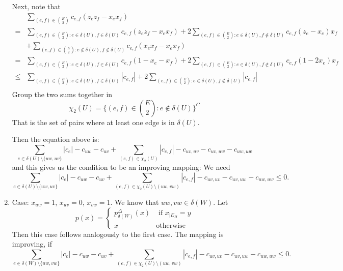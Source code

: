\begin{enumerate}
Next, note that 
\begin{align*}
    & \sum_{(e,f) \in \binom{E}{2}} c_{e,f} (z_e z_f-x_e x_f) \\
    =&  \sum_{(e,f) \in \binom{E}{2}: e \in \delta(U), f \in \delta(U)} c_{e,f} (z_e z_f-x_e x_f) + 2 \sum_{(e,f) \in \binom{E}{2}: e \in \delta(U), f \notin \delta(U)} c_{e,f} (z_e-x_e)x_f \\
    & +\sum_{(e,f) \in \binom{E}{2}: e \notin \delta(U), f \notin \delta(U)} c_{e,f} (x_e x_f - x_e x_f) \\
    =&  \sum_{(e,f) \in \binom{E}{2}: e \in \delta(U), f \in \delta(U)} c_{e,f} (1-x_e-x_f) + 2 \sum_{(e,f) \in \binom{E}{2}: e \in \delta(U), f \notin \delta(U)} c_{e,f} (1-2x_e)x_f \\ 
    \leq &  \sum_{(e,f) \in \binom{E}{2}: e \in \delta(U), f \in \delta(U)} |c_{e,f}| + 2 \sum_{(e,f) \in \binom{E}{2}: e \in \delta(U), f \notin \delta(U)} |c_{e,f}| \\ 
\end{align*}
Group the two sums together in 
\[ \chi_2(U)= \{(e,f) \in \binom{E}{2}: e \notin \delta(U) \}^C \] That is the set of pairs where at least one edge is in $\delta(U)$. 

Then the equation above is:  
\begin{equation}
    \sum_{e \in \delta(U) \setminus \{uw, uv \}} |c_e| - c_{uw} -c_{uv} + \sum_{ (e,f) \in \chi_2(U)} |c_{e,f}| - c_{uv,uv} - c_{uv,uw}-c_{uw,uw}
\end{equation}
and this gives us the condition to be an improving mapping: We need
\begin{equation*}
\sum_{e \in \delta(U) \setminus \{uw, uv \}} |c_e| - c_{uw} -c_{uv} + \sum_{ (e,f) \in \chi_2(U)\setminus (uw, vw)} |c_{e,f}| - c_{uv,uv} - c_{uv,uw}-c_{uw,uw} \leq 0. 
\end{equation*}

\item Case: $x_{uw}=1$, $x_{uv}=0$, $x_{vw}=1$. We know that $uw, vw \in \delta(W)$. 
 Let 
\[ p(x)= \begin{cases}
    p_{\delta(W)}^{\Delta} (x)  & \text{ if } x_{|E_H} =y \\
    x & \text{otherwise} \end{cases} \]
Then this case follows analogously to the first case. The mapping is improving, if 
\begin{equation*}
\sum_{e \in \delta(W) \setminus \{uw, vw \}} |c_e| - c_{uw} -c_{uv} + \sum_{(e,f) \in \chi_2(U)\setminus (uw, vw)} |c_{e,f}| - c_{uv,uv} - c_{uv,uw}-c_{uw,uw} \leq 0. 
\end{equation*}
\end{enumerate}

